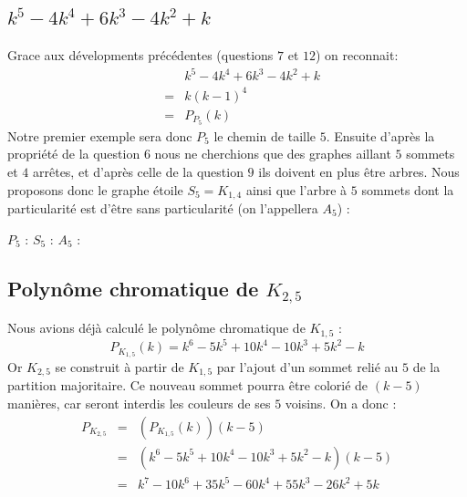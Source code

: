\subsection{$k^5 - 4k^4 + 6k^3 - 4k^2 + k$}
Grace aux dévelopments précédentes (questions $7$ et $12$) on reconnait:
\begin{eqnarray*}
&&		k^5 - 4k^4 + 6k^3 - 4k^2 + k 	\\	
&=&		k(k-1)^4						\\
&=&		P_{P_5}(k)						
\end{eqnarray*}
Notre premier exemple sera donc $P_5$ le chemin de taille $5$. Ensuite d'après la propriété de la question $6$ nous ne cherchions que des graphes aillant $5$ sommets et $4$ arrêtes, et d'après celle de la question $9$ ils doivent en plus être arbres. Nous proposons donc le graphe étoile $S_5 = K_{1,4}$ ainsi que l'arbre à $5$ sommets dont la particularité est d'être sans particularité (on l'appellera $A_5$) :

\begin{center}
$P_5$ :  \hspace{1cm}
$S_5$ :  \hspace{1cm}
$A_5$ : 
\end{center}

\subsection{Polynôme chromatique de $K_{2,5}$}
Nous avions déjà calculé le polynôme chromatique de $K_{1,5}$ :
\[ P_{K_{1,5}}(k) = k^6 - 5k^5  + 10k^4 - 10k^3 + 5k^2 - k \]
Or $K_{2,5}$ se construit à partir de $K_{1,5}$ par l'ajout d'un sommet relié au $5$ de la partition majoritaire. Ce nouveau sommet pourra être colorié de $(k-5)$ manières, car seront interdis les couleurs de ses $5$ voisins. On a donc :
\begin{eqnarray*}
P_{K_{2,5}} & = &	(P_{K_{1,5}}(k))(k-5)								\\
			& = & 	(k^6 - 5k^5  + 10k^4 - 10k^3 + 5k^2 - k)(k-5)		\\	
			& = &	k^7 - 10k^6 + 35k^5 - 60k^4 + 55k^3 - 26k^2 + 5k	
\end{eqnarray*}

